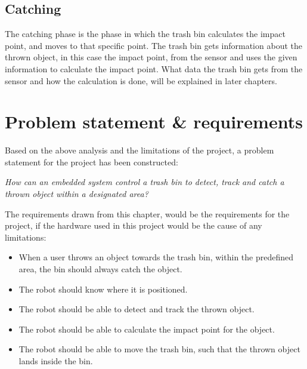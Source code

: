 \subsection{Catching}
\label{sec:CatchingAnalysis}
The catching phase is the phase in which the trash bin calculates the impact point, and moves to that specific point. The trash bin gets information about the thrown object, in this case the impact point, from the sensor and uses the given information to calculate the impact point. What data the trash bin gets from the sensor and how the calculation is done, will be explained in later chapters. 

\section{Problem statement \& requirements}
\label{sec:Problem statement}
Based on the above analysis and the limitations of the project, a problem statement for the project has been constructed:

\textit{How can an embedded system control a trash bin to detect, track and catch a thrown object within a designated area?}

The requirements drawn from this chapter, would be the requirements for the project, if the hardware used in this project would be the cause of any limitations:

\begin{itemize}
\item When a user throws an object towards the trash bin, within the predefined area, the bin should always catch the object.
\item The robot should know where it is positioned.
\item The robot should be able to detect and track the thrown object.
\item The robot should be able to calculate the impact point for the object.
\item The robot should be able to move the trash bin, such that the thrown object lands inside the bin.
\end{itemize}
